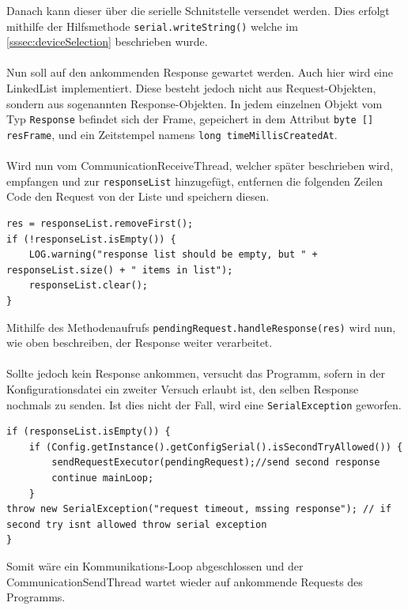 Danach kann dieser über die serielle Schnitstelle versendet werden.
Dies erfolgt mithilfe der Hilfsmethode \lstinline[style=java]{serial.writeString()} welche im \autoref{sssec:deviceSelection} beschrieben wurde.\\\\
Nun soll auf den ankommenden Response gewartet werden.
Auch hier wird eine LinkedList implementiert.
Diese besteht jedoch nicht aus Request-Objekten, sondern aus sogenannten Response-Objekten.
In jedem einzelnen Objekt vom Typ \lstinline[style=java]{Response} befindet sich der Frame, gepeichert in dem Attribut \lstinline[style=java]{byte [] resFrame}, und ein Zeitstempel namens \lstinline[style=java]{long timeMillisCreatedAt}.\\\\
Wird nun vom CommunicationReceiveThread, welcher später beschrieben wird, empfangen und zur \lstinline[style=java]{responseList} hinzugefügt, entfernen die folgenden Zeilen Code den Request von der Liste und speichern diesen.
\begin{lstlisting}[style=java,caption=Java-Codebeispiel,label=commThreadSend]
res = responseList.removeFirst();
if (!responseList.isEmpty()) {
    LOG.warning("response list should be empty, but " + responseList.size() + " items in list");
    responseList.clear();
}
\end{lstlisting}
Mithilfe des Methodenaufrufs \lstinline[style=java]{pendingRequest.handleResponse(res)} wird nun, wie oben beschreiben, der Response weiter verarbeitet.\\\\
Sollte jedoch kein Response ankommen, versucht das Programm, sofern in der Konfigurationsdatei ein zweiter Versuch erlaubt ist, den selben Response nochmals zu senden.
Ist dies nicht der Fall, wird eine \lstinline[style=java]{SerialException} geworfen.
\begin{lstlisting}[style=java,caption=Java-Codebeispiel,label=commThreadSend]
if (responseList.isEmpty()) {
    if (Config.getInstance().getConfigSerial().isSecondTryAllowed()) {
        sendRequestExecutor(pendingRequest);//send second response
        continue mainLoop;
    }
throw new SerialException("request timeout, mssing response"); // if second try isnt allowed throw serial exception
}
\end{lstlisting}
Somit wäre ein Kommunikations-Loop abgeschlossen und der CommunicationSendThread wartet wieder auf ankommende Requests des Programms.\\\\
